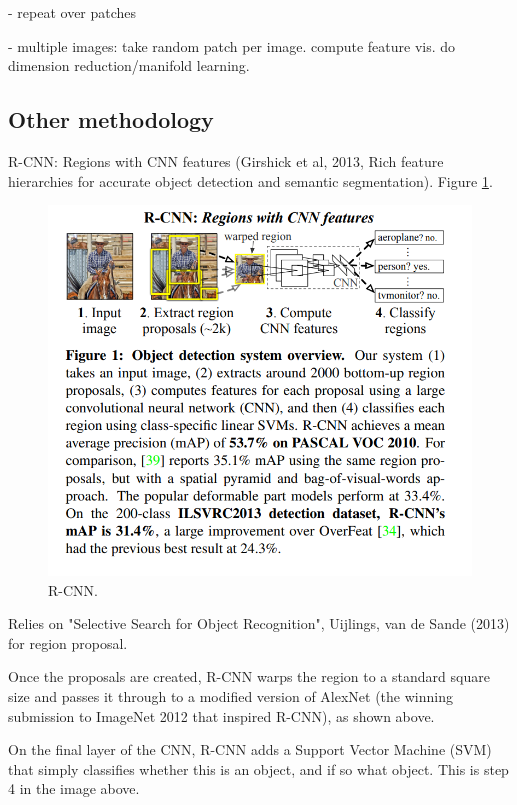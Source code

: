 \documentclass[english]{article}
\begin{document}
- repeat over patches

- multiple images: take random patch per image. compute feature vis. do dimension reduction/manifold learning.

\eenum



\subsection{Other methodology}
\benum
\item R-CNN: Regions with CNN features (Girshick et al, 2013, Rich feature hierarchies for accurate object detection and semantic segmentation). Figure \ref{rcnn}.


\begin{figure}
  \centering
  \includegraphics[scale=0.7]{rcnn.png}
    \caption{R-CNN.}
    \label{rcnn}
\end{figure}

Relies on "Selective Search for Object Recognition", Uijlings, van de Sande (2013) for region proposal.

Once the proposals are created, R-CNN warps the region to a standard square size and passes it through to a modified version of AlexNet (the winning submission to ImageNet 2012 that inspired R-CNN), as shown above.

On the final layer of the CNN, R-CNN adds a Support Vector Machine (SVM) that simply classifies whether this is an object, and if so what object. This is step 4 in the image above.
\end{document}
